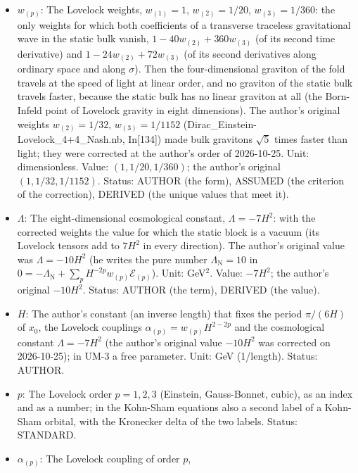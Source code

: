 \documentclass[
  10pt,
]{article}
\providecommand{\tightlist}{%
  \setlength{\itemsep}{0pt}\setlength{\parskip}{0pt}}
\begin{document}
\begin{itemize}
\tightlist
\item
  \(w_{(p)}\): The Lovelock weights, \(w_{(1)} = 1\),
  \(w_{(2)} = 1/20\), \(w_{(3)} = 1/360\): the only weights for which
  both coefficients of a transverse traceless gravitational wave in the
  static bulk vanish, \(1 - 40w_{(2)} + 360w_{(3)}\) (of its second time
  derivative) and \(1 - 24w_{(2)} + 72w_{(3)}\) (of its second
  derivatives along ordinary space and along \(\sigma\)). Then the
  four-dimensional graviton of the fold travels at the speed of light at
  linear order, and no graviton of the static bulk travels faster,
  because the static bulk has no linear graviton at all (the Born-Infeld
  point of Lovelock gravity in eight dimensions). The author's original
  weights \(w_{(2)} = 1/32\), \(w_{(3)} = 1/1152\)
  (Dirac\_Einstein-Lovelock\_4+4\_Nash.nb, In{[}134{]}) made bulk
  gravitons \(\sqrt5\) times faster than light; they were corrected at
  the author's order of 2026-10-25. Unit: dimensionless. Value:
  \((1, 1/20, 1/360)\); the author's original \((1, 1/32, 1/1152)\).
  Status: AUTHOR (the form), ASSUMED (the criterion of the correction),
  DERIVED (the unique values that meet it).
\item
  \(\Lambda\): The eight-dimensional cosmological constant,
  \(\Lambda = -7H^2\): with the corrected weights the value for which
  the static block is a vacuum (its Lovelock tensors add to \(7H^2\) in
  every direction). The author's original value was \(\Lambda = -10H^2\)
  (he writes the pure number \(\Lambda_{\mathrm{N}} = 10\) in
  \(0 = -\Lambda_{\mathrm{N}} + \sum_p H^{-2p}w_{(p)}\mathcal{E}_{(p)}\)).
  Unit: GeV\(^2\). Value: \(-7H^2\); the author's original \(-10H^2\).
  Status: AUTHOR (the term), DERIVED (the value).
\item
  \(H\): The author's constant (an inverse length) that fixes the period
  \(\pi/(6H)\) of \(x_0\), the Lovelock couplings
  \(\alpha_{(p)} = w_{(p)}H^{2-2p}\) and the cosmological constant
  \(\Lambda = -7H^2\) (the author's original value \(-10H^2\) was
  corrected on 2026-10-25); in UM-3 a free parameter. Unit: GeV
  (1/length). Status: AUTHOR.
\item
  \(p\): The Lovelock order \(p = 1, 2, 3\) (Einstein, Gauss-Bonnet,
  cubic), as an index and as a number; in the Kohn-Sham equations also a
  second label of a Kohn-Sham orbital, with the Kronecker delta of the
  two labels. Status: STANDARD.
\item
  \(\alpha_{(p)}\): The Lovelock coupling of order \(p\),

\end{itemize}
\end{document}
